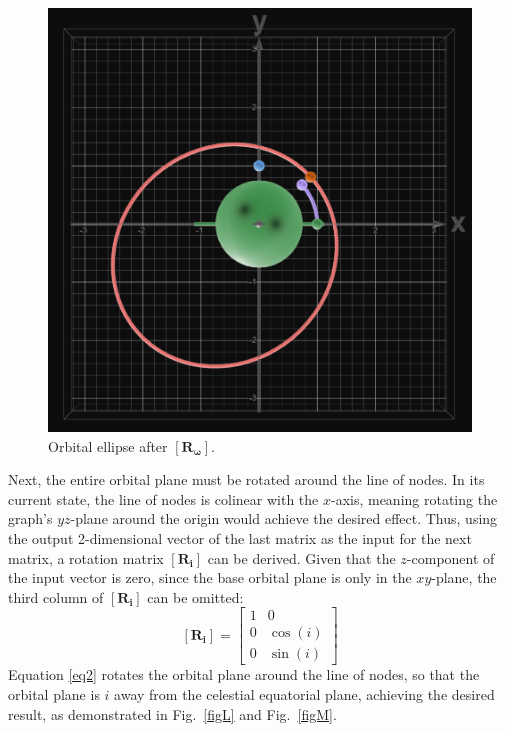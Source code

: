 \documentclass[conference]{IEEEtran}
\begin{document}
			\begin{figure}[hbtp]
				\begin{center}
					\includegraphics[width=0.8\columnwidth]{2.png}
				\end{center}
				\caption{Orbital ellipse after \( \bm{\left[R_{\omega}\right]} \).}
				\label{figK}
			\end{figure}

			Next, the entire orbital plane must be rotated around the line of nodes. In its current state, the line of nodes is colinear with the \( x \)-axis, meaning rotating the graph's \( yz \)-plane around the origin would achieve the desired effect. Thus, using the output 2-dimensional vector of the last matrix as the input for the next matrix, a rotation matrix \( \bm{\left[R_i\right]} \) can be derived. Given that the \( z \)-component of the input vector is zero, since the base orbital plane is only in the \( xy \)-plane, the third column of \( \bm{\left[R_i\right]} \) can be omitted:
			\begin{equation}
				\bm{\left[R_i\right]}=
				\begin{bmatrix}
					1 & 0\\
					0 & \cos{\left(i\right)}\\
					0 & \sin{\left(i\right)}
				\end{bmatrix}
				\label{eq2}
			\end{equation}
			Equation \eqref{eq2} rotates the orbital plane around the line of nodes, so that the orbital plane is \( i \) away from the celestial equatorial plane, achieving the desired result, as demonstrated in Fig.~\ref{figL} and Fig.~\ref{figM}.
\end{document}
